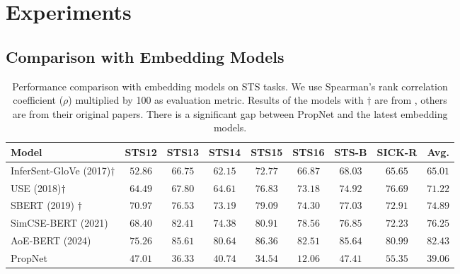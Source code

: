 \section{Experiments}


\subsection{Comparison with Embedding Models}

\begin{table*}[h!]
\small
\centering
\begin{tabular}{lcccccccc}
\toprule
Model & STS12 & STS13 & STS14 & STS15 & STS16 & STS-B & SICK-R & Avg. \\

\midrule
InferSent-GloVe (2017)$\dagger$  & $52.86$ & $66.75$ & $62.15$ & $72.77$ & $66.87$ & $68.03$ & $65.65$ & $65.01$ \\
USE (2018)$\dagger$  & $64.49$ & $67.80$ & $64.61$ & $76.83$ & $73.18$ & $74.92$ & $76.69$ & $71.22$ \\
SBERT (2019) $\dagger$ & $70.97$ & $76.53$ & $73.19$ & $79.09$ & $74.30$ & $77.03$ & $72.91$ & $74.89$ \\
SimCSE-BERT (2021) & $68.40$ & $82.41$ & $74.38$ & $80.91$ & $78.56$ & $76.85$ & $72.23$ & $76.25$ \\
AoE-BERT (2024) & $75.26$ & $85.61$ & $80.64$ & $86.36$ & $82.51$ & $85.64$ & $80.99$ & $82.43$ \\

\midrule

PropNet & $\mathbf{47.01}$ & $\mathbf{36.33}$ & $\mathbf{40.74}$ & $\mathbf{34.54}$ & $\mathbf{12.06}$ & $\mathbf{47.41}$ & $\mathbf{55.35}$ & $\mathbf{39.06}$ \\ 

\bottomrule
\end{tabular}
\caption{Performance comparison with embedding models on STS tasks. We use Spearman's rank correlation coefficient ($\rho$) multiplied by 100 as evaluation metric. Results of the models with $\dagger$ are from \citep{Reimers2019SentenceBERTSE}, others are from their original papers. There is a significant gap between PropNet and the latest embedding models.
}
\label{table-main-sts-results}
\end{table*}

